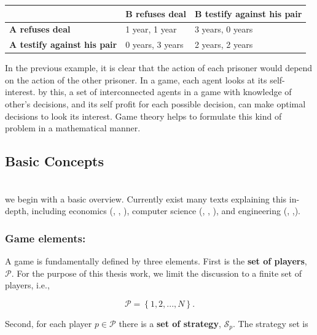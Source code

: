 \begin{table}[h!]
\centering
\begin{tabular}{l|l|l}
                                    & \textbf{B refuses deal} & \textbf{B testify against  his pair} \\ \hline
\textbf{A refuses deal}             & 1 year, 1 year          & 3 years, 0 years                     \\ \hline
\textbf{A testify against his pair} & 0 years, 3 years        & 2 years, 2 years                    
\end{tabular}
\end{table}

In the previous example, it is clear that the action of each prisoner would depend on the action of the other prisoner. In a game, each agent looks at its self-interest. by this, a set of interconnected agents in a game with knowledge of other's decisions, and its self profit for each possible decision, can make optimal decisions to look its interest. Game theory helps to formulate this kind of problem in a mathematical manner.


\subsection{Basic Concepts}
\\
we begin with a basic overview. Currently exist many texts explaining this in-depth, including economics (\cite{33t_GameTheory2}, \cite{5shamma_game}, \cite{6shamma_course}), computer science (\cite{7shamma_prediction}, \cite{29t_book}, \cite{9shamma_algorithmic}), and engineering (\cite{10shamma_dynamic}, \cite{11shamma_game},\cite{12shamma_noncooperative}).

\subsubsection{Game elements:}

A game is fundamentally defined by three elements. First is the \textbf{set of players}, $\mathcal{P}$. For the purpose of this thesis work, we limit the discussion to a finite set of players, i.e., 

\begin{equation*}
\mathcal{P}= \left\{ 1,2,..., N \right\}.
\end{equation*}

Second, for each player $p \in \mathcal{P}$ there is a \textbf{set of strategy}, $\mathcal{S}_p$. The strategy set is 


